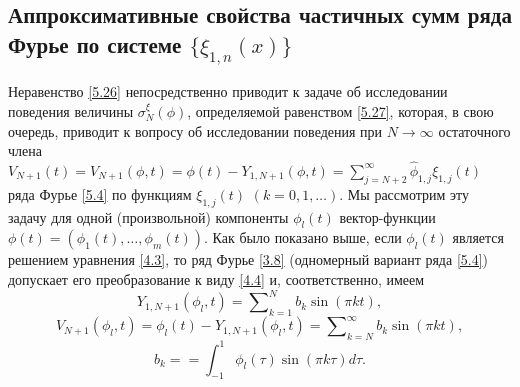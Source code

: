 \documentclass{article}
\numberwithin{equation}{section}
\theoremstyle{plain}
\theoremstyle{definition}
\begin{document}
\begin{fulltext}
\section{Аппроксимативные свойства частичных сумм ряда  Фурье по системе
$\{\xi_{1,n}(x)\}$}\label{s6}

Неравенство \eqref{5.26} непосредственно приводит к  задаче об исследовании поведения величины $\sigma_N^\xi(\phi)$, определяемой равенством \eqref{5.27}, которая, в свою очередь, приводит к вопросу об исследовании поведения при $N\to\infty$ остаточного члена $V_{N+1}(t)=V_{N+1}(\phi,t)=\phi(t)-Y_{1,N+1}(\phi,t)=\sum\nolimits_{j=N+2}^\infty \hat \phi_{1,j}\xi_{1,j}(t)$  ряда Фурье \eqref{5.4} по функциям $\xi_{1,j}(t)$ $(k=0,1,\ldots)$. Мы рассмотрим эту задачу
для одной (произвольной) компоненты $\phi_l(t)$ вектор-функции $\phi(t)=(\phi_1(t),\ldots,\phi_m(t))$. Как было показано выше, если $\phi_l(t)$ является решением уравнения \eqref{4.3}, то  ряд Фурье \eqref{3.8} (одномерный вариант ряда  \eqref{5.4}) допускает его преобразование к виду \eqref{4.4} и, соответственно, имеем
\begin{equation}\label{6.1}
Y_{1,N+1}(\phi_l,t)=\sum\nolimits_{k=1}^{N} b_k\sin(\pi kt),
\end{equation}
\begin{equation}\label{6.2}
V_{N+1}(\phi_l,t)=\phi_l(t)-Y_{1,N+1}(\phi_l,t)= \sum\nolimits_{k=N}^\infty b_k\sin(\pi kt),
\end{equation}
\begin{equation*}
b_k==\int_{-1}^1 \phi_l(\tau)\sin(\pi k\tau)d\tau.
\end{equation*}


\end{fulltext}
\end{document}
